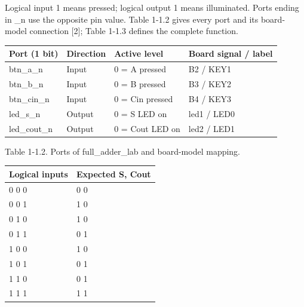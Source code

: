 \documentclass[10pt,a4paper]{article}
\begin{document}
Logical input 1 means pressed; logical output 1 means illuminated. Ports ending in \_n use the opposite pin value. Table 1-1.2 gives every port and its board-model connection [2]; Table 1-1.3 defines the complete function.\par

\begingroup\small\setlength{\tabcolsep}{4pt}
\renewcommand{\arraystretch}{1.20}
\noindent\begin{tabular}{@{}p{}p{}p{}p{}@{}}
\toprule
\textbf{Port (1 bit)} & \textbf{Direction} & \textbf{Active level} & \textbf{Board signal / label} \\
\midrule
btn\_a\_n & Input & 0 = A pressed & B2 / KEY1 \\
btn\_b\_n & Input & 0 = B pressed & B3 / KEY2 \\
btn\_cin\_n & Input & 0 = Cin pressed & B4 / KEY3 \\
led\_s\_n & Output & 0 = S LED on & led1 / LED0 \\
led\_cout\_n & Output & 0 = Cout LED on & led2 / LED1 \\
\bottomrule
\end{tabular}\par\endgroup
\vspace{2mm}

{\small\raggedright Table 1-1.2. Ports of full\_adder\_lab and board-model mapping.\par}

\begingroup\small\setlength{\tabcolsep}{4pt}
\renewcommand{\arraystretch}{1.20}
\noindent\begin{tabular}{@{}p{}p{}@{}}
\toprule
\textbf{Logical inputs} & \textbf{Expected S, Cout} \\
\midrule
0 0 0 & 0 0 \\
0 0 1 & 1 0 \\
0 1 0 & 1 0 \\
0 1 1 & 0 1 \\
1 0 0 & 1 0 \\
1 0 1 & 0 1 \\
1 1 0 & 0 1 \\
1 1 1 & 1 1 \\
\bottomrule
\end{tabular}\par\endgroup
\vspace{2mm}
\end{document}
